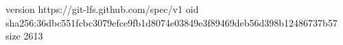 version https://git-lfs.github.com/spec/v1
oid sha256:36dbc551fcbc3079efce9fb1d8074e03849e3f89469deb56d398b12486737b57
size 2613
